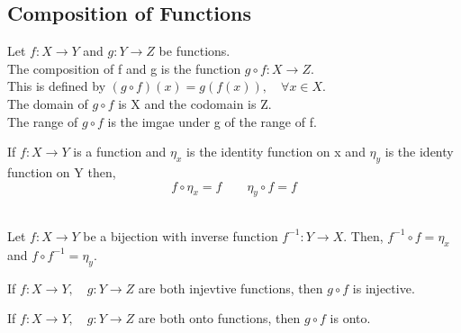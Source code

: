  \subsection{Composition of Functions}
 Let \(f: X\to Y\) and \(g: Y\to Z\) be functions.\\
 The composition of f and g is the function \(g\circ f: X\to Z\).\\
 This is defined by \((g\circ f)(x) = g(f(x)), \quad \forall x \in X\).\\
 The domain of \(g\circ f\) is X and the codomain is Z.\\
 The range of \(g\circ f\) is the imgae under g of the range of f.\\
 \begin{theorm}
     If \(f: X\to Y\) is a function and \(\eta_x\) is the identity function on x and \(\eta_y\) is the identy function on Y then, \[f\circ \eta_x = f \qquad \eta_y\circ f = f\]\\
 \end{theorm}
 \begin{theorm}
     Let \(f: X\to Y\) be a bijection with inverse function \(f^{-1}: Y\to X\). Then, \(f^{-1}\circ f = \eta_x\) and \(f\circ f^{-1} = \eta_y\).\\
 \end{theorm}
 \begin{theorm}
     If \(f: X\to Y, \quad g:Y\to Z\) are both injevtive functions, then \(g\circ f\) is injective.\\
 \end{theorm}
 \begin{theorm}
    If \(f: X\to Y, \quad g:Y\to Z\) are both onto functions, then \(g\circ f\) is onto.\\     
 \end{theorm}
